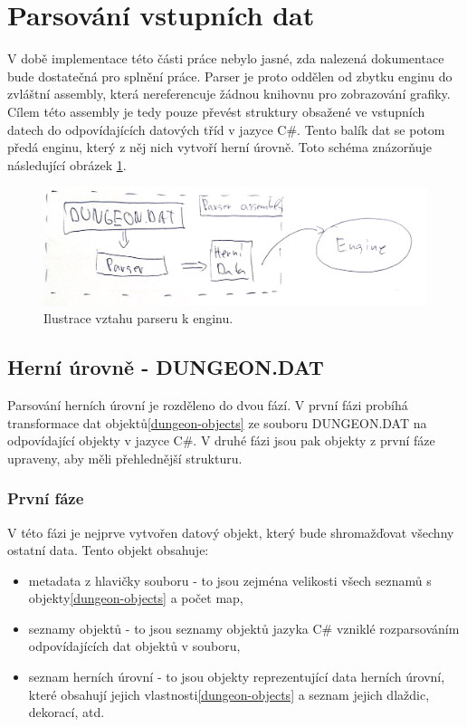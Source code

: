 \section{Parsování vstupních dat}\label{level-parsing}

V době implementace této části práce nebylo jasné, zda nalezená dokumentace\cite{TechnicalDocumentationFontanel05} bude dostatečná
pro splnění práce. Parser je proto oddělen od zbytku enginu do zvláštní assembly, která nereferencuje žádnou knihovnu
pro zobrazování grafiky. Cílem této assembly je tedy pouze převést struktury obsažené ve vstupních datech do odpovídajících
datových tříd v jazyce C\#. Tento balík dat se potom předá enginu, který z něj nich vytvoří herní úrovně. Toto schéma 
znázorňuje následující obrázek \ref{parser-preview:analyza}.

\begin{figure}[H]\centering
\includegraphics[width=\textwidth]{./img/DM-parser-preview.png}
\caption{Ilustrace vztahu parseru k enginu.}
\label{parser-preview:analyza}
\end{figure}

\subsection{Herní úrovně - DUNGEON.DAT}\label{dungeon-parser}

Parsování herních úrovní je rozděleno do dvou fází. V první fázi probíhá transformace dat objektů\vref{dungeon-objects} ze souboru DUNGEON.DAT
 na odpovídající objekty v jazyce C\#. V druhé fázi jsou pak objekty z první fáze upraveny,
aby měli přehlednější strukturu. 


\subsubsection{První fáze}

V této fázi je nejprve vytvořen datový objekt, který bude shromažďovat všechny ostatní data. Tento objekt obsahuje:

\begin{itemize}
\item metadata z hlavičky souboru - to jsou zejména velikosti všech seznamů s objekty\vref{dungeon-objects} a počet map,
\item seznamy objektů - to jsou seznamy objektů jazyka C\# vzniklé rozparsováním odpovídajících dat objektů v souboru,
\item seznam herních úrovní - to jsou objekty reprezentující data herních úrovní, které obsahují jejich vlastnosti\vref{dungeon-objects}
 a seznam jejich dlaždic, dekorací, atd. 
\end{itemize}


